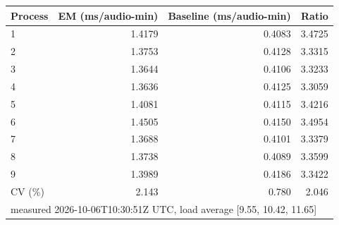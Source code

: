 \begin{tabular}{lrrr}
\toprule
Process & EM (ms/audio-min) & Baseline (ms/audio-min) & Ratio \\
\midrule
1 & 1.4179 & 0.4083 & 3.4725 \\
2 & 1.3753 & 0.4128 & 3.3315 \\
3 & 1.3644 & 0.4106 & 3.3233 \\
4 & 1.3636 & 0.4125 & 3.3059 \\
5 & 1.4081 & 0.4115 & 3.4216 \\
6 & 1.4505 & 0.4150 & 3.4954 \\
7 & 1.3688 & 0.4101 & 3.3379 \\
8 & 1.3738 & 0.4089 & 3.3599 \\
9 & 1.3989 & 0.4186 & 3.3422 \\
\midrule
CV (\%) & 2.143 & 0.780 & 2.046 \\
\midrule
\multicolumn{4}{l}{\footnotesize measured 2026-10-06T10:30:51Z UTC, load average [9.55, 10.42, 11.65]} \\
\bottomrule
\end{tabular}
